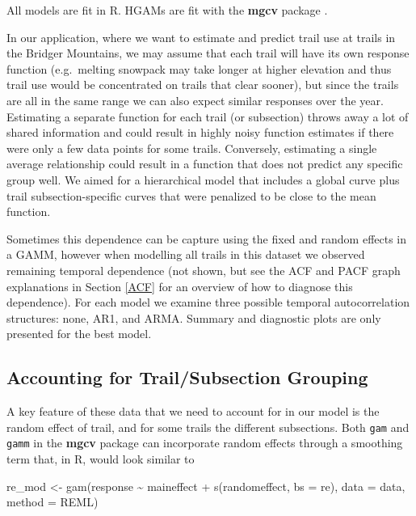 \documentclass[
]{book}
\newenvironment{Shaded}{\begin{snugshade}}{\end{snugshade}}
\newcommand{\AttributeTok}[1]{\textcolor[rgb]{0.77,0.63,0.00}{#1}}
\newcommand{\FunctionTok}[1]{\textcolor[rgb]{0.00,0.00,0.00}{#1}}
\newcommand{\NormalTok}[1]{#1}
\newcommand{\OtherTok}[1]{\textcolor[rgb]{0.56,0.35,0.01}{#1}}
\newcommand{\SpecialCharTok}[1]{\textcolor[rgb]{0.00,0.00,0.00}{#1}}
\newcommand{\StringTok}[1]{\textcolor[rgb]{0.31,0.60,0.02}{#1}}
\begin{document}
All models are fit in R. HGAMs are fit with the \textbf{mgcv} package \citep[\citet{R-Wood2}, \citet{R-Wood3}, \citet{R-Wood4}, \citet{R-Wood5}]{R-Wood1}.

In our application, where we want to estimate and predict trail use at trails in the Bridger Mountains, we may assume that each trail will have its own response function (e.g.~melting snowpack may take longer at higher elevation and thus trail use would be concentrated on trails that clear sooner), but since the trails are all in the same range we can also expect similar responses over the year. Estimating a separate function for each trail (or subsection) throws away a lot of shared information and could result in highly noisy function estimates if there were only a few data points for some trails. Conversely, estimating a single average relationship could result in a function that does not predict any specific group well. We aimed for a hierarchical model that includes a global curve plus trail subsection-specific curves that were penalized to be close to the mean function.

Sometimes this dependence can be capture using the fixed and random effects in a GAMM, however when modelling all trails in this dataset we observed remaining temporal dependence (not shown, but see the ACF and PACF graph explanations in Section \ref{ACF} for an overview of how to diagnose this dependence). For each model we examine three possible temporal autocorrelation structures: none, AR1, and ARMA. Summary and diagnostic plots are only presented for the best model.

\hypertarget{accounting-for-trailsubsection-grouping}{%
\subsection{Accounting for Trail/Subsection Grouping}\label{accounting-for-trailsubsection-grouping}}

A key feature of these data that we need to account for in our model is the random effect of trail, and for some trails the different subsections. Both \texttt{gam} and \texttt{gamm} in the \textbf{mgcv} package can incorporate random effects through a smoothing term that, in R, would look similar to

\begin{Shaded}
\begin{Highlighting}[]
\NormalTok{re\_mod }\OtherTok{\textless{}{-}} \FunctionTok{gam}\NormalTok{(response }\SpecialCharTok{\textasciitilde{}}\NormalTok{ maineffect }\SpecialCharTok{+}
                \FunctionTok{s}\NormalTok{(randomeffect, }\AttributeTok{bs =} \StringTok{\textquotesingle{}re\textquotesingle{}}\NormalTok{),}
              \AttributeTok{data =}\NormalTok{ data,}
              \AttributeTok{method =} \StringTok{\textquotesingle{}REML\textquotesingle{}}\NormalTok{)}
\end{Highlighting}
\end{Shaded}
\end{document}
